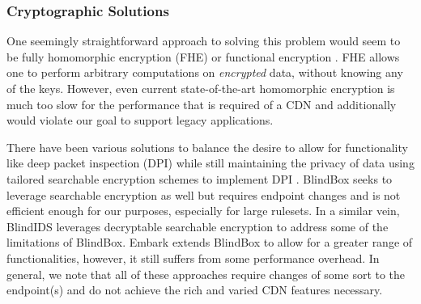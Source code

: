 \subsubsection{Cryptographic Solutions}

One seemingly straightforward approach to solving this problem would seem to be
fully homomorphic encryption (FHE) or functional encryption
\cite{gentry2009fully, gentry2010computing, garg2016candidate}.  FHE allows one
to perform arbitrary computations on \textit{encrypted} data, without knowing
any of the keys.  However, even current state-of-the-art homomorphic encryption
is much too slow for the performance that is required of a CDN and additionally
would violate our goal to support legacy applications.

There have been various solutions to balance the desire to allow for
functionality like deep packet inspection (DPI) while still maintaining the
privacy of data using tailored searchable encryption schemes to implement DPI
\cite{desmoulins2018pattern, sherry2015blindbox, canard2017blindids}.  BlindBox
\cite{sherry2015blindbox} seeks to leverage searchable encryption as well but
requires endpoint changes and is not efficient enough for our purposes,
especially for large rulesets.  In a similar vein, BlindIDS
\cite{canard2017blindids} leverages decryptable searchable encryption to
address some of the limitations of BlindBox.
Embark \cite{lan2016embark} extends BlindBox to allow for a greater range of
functionalities, however, it still suffers from some performance overhead.  In
general, we note that all of these approaches require changes of some sort to
the endpoint(s) and do not achieve the rich and varied CDN features necessary.

